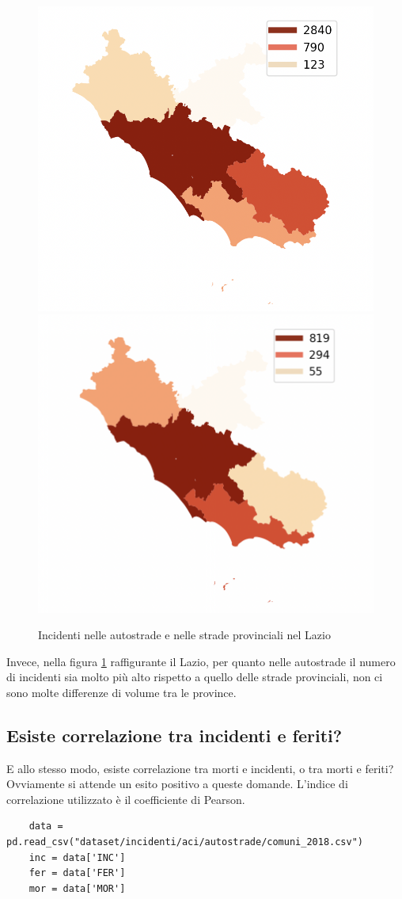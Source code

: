 \documentclass[a4paper]{report}
\begin{document}
\begin{figure}
    \includegraphics[width=0.5\linewidth]{../src/provincia/lazio_autostrade.png}
    \includegraphics[width=0.5\linewidth]{../src/provincia/lazio_strade_prov.png}
    \caption{Incidenti nelle autostrade e nelle strade provinciali nel Lazio}
    \label{fig:lazio-strade}
\end{figure}

Invece, nella figura \ref{fig:lazio-strade} raffigurante il Lazio, 
per quanto nelle autostrade il numero di incidenti sia molto più alto 
rispetto a quello delle strade provinciali, 
non ci sono molte differenze di volume tra le province.

\subsection{Esiste correlazione tra incidenti e feriti?}

E allo stesso modo, esiste correlazione tra morti e incidenti, o tra morti e feriti?\\
Ovviamente si attende un esito positivo a queste domande.
L'indice di correlazione utilizzato è il coefficiente di Pearson.

\begin{lstlisting}
    data = pd.read_csv("dataset/incidenti/aci/autostrade/comuni_2018.csv")
    inc = data['INC']
    fer = data['FER']
    mor = data['MOR']
\end{lstlisting}
\end{document}
